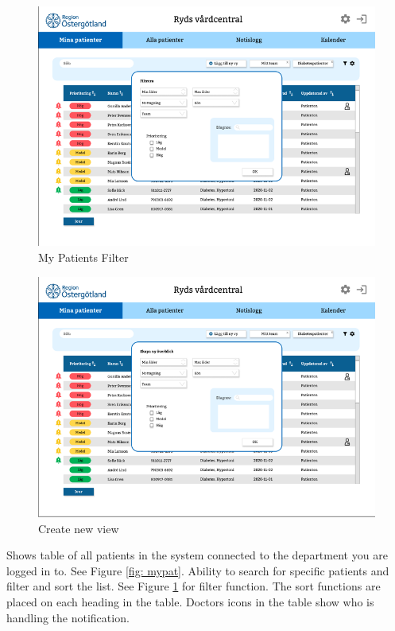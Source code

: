 \documentclass{scrreprt}
\begin{document}
\begin{figure}[h!]
    \centering
    \includegraphics[width=15cm]{mypatfilter.png}
    \caption{My Patients Filter}
    \label{fig: mypatfilter}
\end{figure}

\begin{figure}[h!]
    \centering
    \includegraphics[width=15cm]{createnewview.png}
    \caption{Create new view}
    \label{fig: createnewview}
\end{figure}

Shows table of all patients in the system connected to the department you are logged in to. See Figure \ref{fig: mypat}. Ability to search for specific patients and filter and sort the list. See Figure \ref{fig: mypatfilter} for filter function. The sort functions are placed on each heading in the table. Doctors icons in the table show who is handling the notification.
\end{document}
